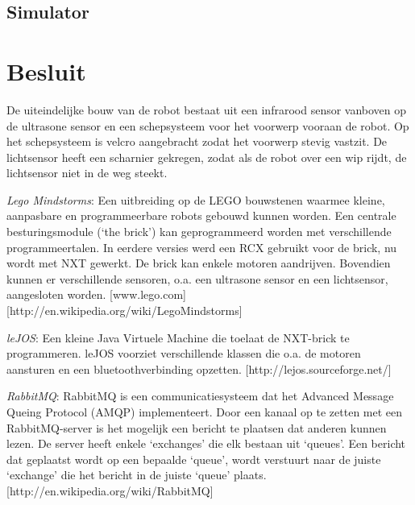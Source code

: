 \documentclass[tt1]{penoverslag}
\begin{document}
\subsection{Simulator}
\label{ssec:Sim}


\section{Besluit}
De uiteindelijke bouw van de robot bestaat uit een infrarood sensor vanboven op de ultrasone sensor en een schepsysteem voor het voorwerp vooraan de robot. Op het schepsysteem is velcro aangebracht zodat het voorwerp stevig vastzit. De lichtsensor heeft een scharnier gekregen, zodat als de robot over een wip rijdt, de lichtsensor niet in de weg steekt. 





\newpage



\begin{thebibliography}{9}
\textit{Lego Mindstorms}:  Een uitbreiding op de LEGO bouwstenen waarmee kleine, aanpasbare en programmeerbare robots gebouwd kunnen worden. Een centrale besturingsmodule (`the brick') kan geprogrammeerd worden met verschillende programmeertalen. In eerdere versies werd een RCX gebruikt voor de brick, nu wordt met NXT gewerkt. De brick kan enkele motoren aandrijven. Bovendien kunnen er verschillende sensoren, o.a. een ultrasone sensor en een lichtsensor, aangesloten worden.  \mbox{[www.lego.com]} \mbox{[http://en.wikipedia.org/wiki/Lego\textendash Mindstorms]}

\textit{leJOS}: Een kleine Java Virtuele Machine die toelaat de NXT-brick te programmeren. leJOS voorziet verschillende klassen die o.a. de motoren aansturen en een bluetoothverbinding opzetten.  \mbox{[http://lejos.sourceforge.net/]}

\textit{RabbitMQ}: RabbitMQ is een communicatiesysteem dat het Advanced Message Queing Protocol (AMQP) implementeert. Door een kanaal op te zetten met een RabbitMQ-server is het mogelijk een bericht te plaatsen dat anderen kunnen lezen. De server heeft enkele `exchanges' die elk bestaan uit `queues'. Een bericht dat geplaatst wordt op een bepaalde `queue', wordt verstuurt naar de juiste `exchange' die het bericht in de juiste `queue' plaats.
\mbox{[http://en.wikipedia.org/wiki/RabbitMQ]}


\end{thebibliography}
\end{document}
